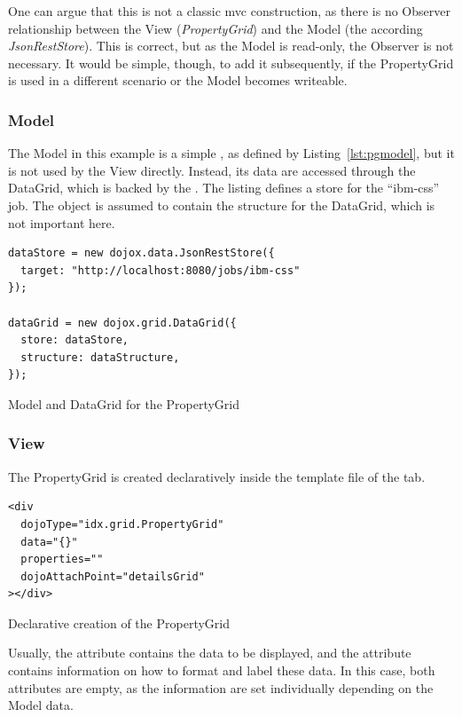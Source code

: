 One can argue that this is not a classic \ac{mvc} construction, as there is no Observer relationship between the View (\emph{PropertyGrid}) and the Model (the according \emph{JsonRestStore}). This is correct, but as the Model is read-only, the Observer is not necessary. It would be simple, though, to add it subsequently, if the PropertyGrid is used in a different scenario or the Model becomes writeable.

\subsubsection{Model}
The Model in this example is a simple , as defined by Listing~\ref{lst:pgmodel}, but it is not used by the View directly. Instead, its data are accessed through the DataGrid, which is backed by the . The listing defines a store for the ``ibm-css'' job. The  object is assumed to contain the structure for the DataGrid, which is not important here.
\begin{listing}[H]
\begin{verbatim}
dataStore = new dojox.data.JsonRestStore({
  target: "http://localhost:8080/jobs/ibm-css"
});

dataGrid = new dojox.grid.DataGrid({
  store: dataStore,
  structure: dataStructure,
});
\end{verbatim}
\caption{Model and DataGrid for the PropertyGrid}
\label{lst:pgmodel}
\end{listing}

\subsubsection{View}
The PropertyGrid is created declaratively inside the template file of the tab.

\begin{listing}[H]
\begin{verbatim}
<div
  dojoType="idx.grid.PropertyGrid"
  data="{}"
  properties=""
  dojoAttachPoint="detailsGrid"
></div>
\end{verbatim}
\caption{Declarative creation of the PropertyGrid}
\label{lst:pgview}
\end{listing}
Usually, the  attribute contains the data to be displayed, and the  attribute contains information on how to format and label these data. In this case, both attributes are empty, as the information are set individually depending on the Model data.

